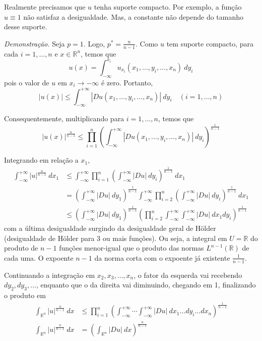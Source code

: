 \documentclass[a4paper, 11pt]{book}
\newcommand{\R}{\mathbb{R}}
\newcommand{\Rn}{{\mathbb{R}^n}}
\begin{document}
Realmente precisamos que $u$ tenha suporte compacto. Por exemplo, a função $u \equiv 1$ não satisfaz a desigualdade. Mas, a constante não depende do tamanho desse suporte.

\textit{Demonstração.} Seja $p=1$. Logo, $p^* = \frac{n}{n-1}$. Como $u$ tem suporte compacto, para cada $i=1,\ldots,n$ e $x \in \Rn$, temos que \[ u(x) = \int_{-\infty}^{x_i} u_{x_i}(x_1, \ldots, y_i, \ldots, x_n) \ dy_i\] pois o valor de $u$ em $x_i \rightarrow -\infty$ é zero. Portanto, \[ |u(x)| \leq \int_{-\infty}^{+\infty} \left| Du(x_1, \ldots, y_i, \ldots, x_n) \right|\ dy_i \quad (i=1, \ldots, n)\]

Consequentemente, multiplicando para $i=1, \ldots, n$, temos que \[ |u(x)|^{\frac{n}{n-1}} \leq \prod_{i=1}^{n} \left( \int_{-\infty}^{+\infty} |Du(x_1, \ldots, y_i, \ldots, x_n)| \ dy_i \right)^{\frac{1}{n-1}}  \]

Integrando em relação a $x_1$, \begin{align*}
	\int_{-\infty}^{+\infty} |u|^{\frac{n}{n-1}}\ dx_1 &\leq \int_{-\infty}^{+\infty} \prod_{i=1}^{n} \left( \int_{-\infty}^{+\infty} |Du|\ dy_i \right)^{\frac{1}{n-1}}\ dx_1 \\
	&= \left( \int_{-\infty}^{+\infty} |Du|\ dy_1 \right)^{\frac{1}{n-1}} \int_{-\infty}^{+\infty} \prod_{i=2}^{n} \left( \int_{-\infty}^{+\infty} |Du|\ dy_i \right)^{\frac{1}{n-1}}\ dx_1 \\
	&\leq \left( \int_{-\infty}^{+\infty} |Du|\ dy_1 \right)^{\frac{1}{n-1}}  \left( \prod_{i=2}^{n} \int_{-\infty}^{+\infty} \int_{-\infty}^{+\infty} |Du|\ dx_1 dy_i \right)^{\frac{1}{n-1}} 
\end{align*} com a última desigualdade surgindo da desigualdade geral de Hölder (desigualdade de Hölder para 3 ou mais funções). Ou seja, a integral em $U=\R$ do produto de $n-1$ funções menor-igual que o produto das normas $L^{n-1}(\R)$  de cada uma. O expoente $n-1$ da norma corta com o expoente já existente \( \frac{1}{n-1} \).

Continuando a integração em $x_2, x_3, \ldots, x_n$, o fator da esquerda vai recebendo $dy_2, dy_3, \ldots$, enquanto que o da direita vai diminuindo, chegando em 1, finalizando o produto em \begin{align*}
	\int_\Rn |u|^{\frac{n}{n-1}}\ dx &\leq \prod_{i=1}^{n} \left(  \int_{-\infty}^{+\infty} \cdots \int_{-\infty}^{+\infty} |Du|\ dx_1 \ldots dy_i \ldots dx_n \right)^{\frac{1}{n-1}}\\
		\int_\Rn |u|^{\frac{n}{n-1}}\ dx &= \left( \int_{\Rn} |Du|\ dx \right)^{\frac{n}{n-1}}
\end{align*}  
\end{document}
